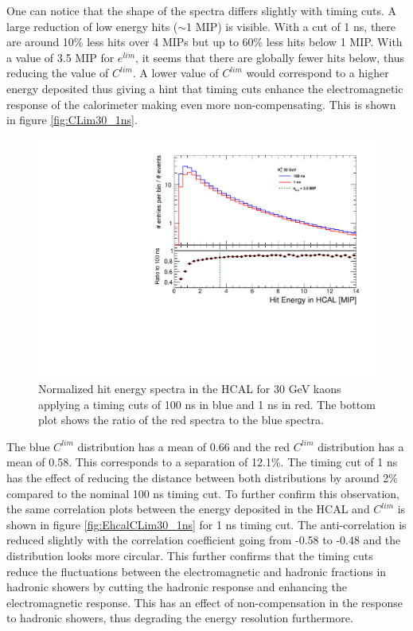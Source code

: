 One can notice that the shape of the spectra differs slightly with timing cuts. A large reduction of low energy hits ($\sim$1 MIP) is visible. With a cut of 1 ns, there are around 10\% less hits over 4 MIPs but up to 60\% less hits below 1 MIP. With a value of 3.5 MIP for $e^{lim}$, it seems that there are globally fewer hits below, thus reducing the value of $C^{lim}$. A lower value of $C^{lim}$ would correspond to a higher energy deposited thus giving a hint that timing cuts enhance the electromagnetic response of the calorimeter making even more non-compensating. This is shown in figure \ref{fig:CLim30_1ns}.

\begin{figure}[htbp!]
  \centering
  \includegraphics[width=0.6\linewidth]{../Thesis_Plots/ILD/AdditionalPlots/Plots/HitEnergySpectra_Comparison_30GeV.pdf}
  \caption{Normalized hit energy spectra in the HCAL for 30 GeV kaons applying a timing cuts of 100 ns in blue and 1 ns in red. The bottom plot shows the ratio of the red spectra to the blue spectra.} \label{fig:HitSpectra30_timingcuts}
\end{figure}


The blue $C^{lim}$ distribution has a mean of 0.66 and the red $C^{lim}$ distribution has a mean of 0.58. This corresponds to a separation of 12.1\%. The timing cut of 1 ns has the effect of reducing the distance between both distributions by around 2\% compared to the nominal 100 ns timing cut. To further confirm this observation, the same correlation plots between the energy deposited in the HCAL and $C^{lim}$ is shown in figure \ref{fig:EhcalCLim30_1ns} for 1 ns timing cut. The anti-correlation is reduced slightly with the correlation coefficient going from -0.58 to -0.48 and the distribution looks more circular. This further confirms that the timing cuts reduce the fluctuations between the electromagnetic and hadronic fractions in hadronic showers by cutting the hadronic response and enhancing the electromagnetic response. This has an effect of non-compensation in the response to hadronic showers, thus degrading the energy resolution furthermore.

